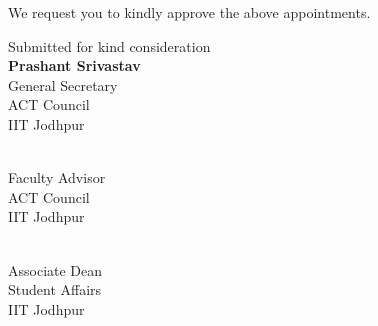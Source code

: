 \documentclass[11pt,letterpaper]{article}
\newcommand{\GSname}{Prashant Srivastav}
\newcommand{\FAname}{Dr. Hardik Jain}
\newcommand{\ADname}{Dr. Pranay Ranjan}
\newcommand{\signature}[3]{%
  \begin{minipage}[t]{0.45\textwidth}\raggedright
  \vspace{1.2cm}{\bfseries #1}\\ #2\\ #3\\ IIT Jodhpur\end{minipage}}
\begin{document}
We request you to kindly approve the above appointments.

\bigskip
\begin{flushright}
  {\small Submitted for kind consideration}\\[1.2cm]
  {\large\bfseries \GSname}\\
  General Secretary\\
  ACT Council\\
  IIT Jodhpur
\end{flushright}

\noindent\signature{\FAname}{Faculty Advisor}{ACT Council}\par
\noindent\signature{\ADname}{Associate Dean}{Student Affairs}
\end{document}
